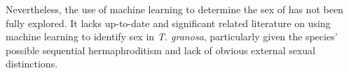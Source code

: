 Nevertheless, the use of machine learning to determine the sex of \Tgranosa has not been fully explored. It lacks up-to-date and significant related literature on using machine learning to identify sex in \textit{T. granosa}, particularly given the species’ possible sequential hermaphroditism and lack of obvious external sexual distinctions.










